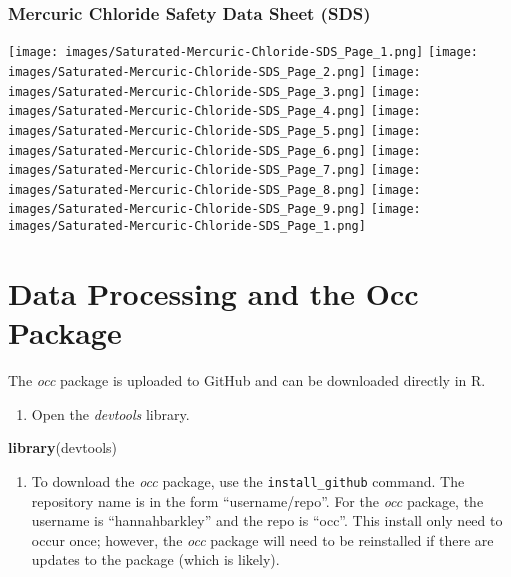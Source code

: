\documentclass[]{book}
\newenvironment{Shaded}{\begin{snugshade}}{\end{snugshade}}
\newcommand{\KeywordTok}[1]{\textcolor[rgb]{0.13,0.29,0.53}{\textbf{#1}}}
\newcommand{\NormalTok}[1]{#1}
\providecommand{\tightlist}{%
  \setlength{\itemsep}{0pt}\setlength{\parskip}{0pt}}
\begin{document}
\subsection{Mercuric Chloride Safety Data Sheet
(SDS)}\label{mercuric-chloride-safety-data-sheet-sds}

\texttt{[image: images/Saturated-Mercuric-Chloride-SDS\_Page\_1.png]}
\texttt{[image: images/Saturated-Mercuric-Chloride-SDS\_Page\_2.png]}
\texttt{[image: images/Saturated-Mercuric-Chloride-SDS\_Page\_3.png]}
\texttt{[image: images/Saturated-Mercuric-Chloride-SDS\_Page\_4.png]}
\texttt{[image: images/Saturated-Mercuric-Chloride-SDS\_Page\_5.png]}
\texttt{[image: images/Saturated-Mercuric-Chloride-SDS\_Page\_6.png]}
\texttt{[image: images/Saturated-Mercuric-Chloride-SDS\_Page\_7.png]}
\texttt{[image: images/Saturated-Mercuric-Chloride-SDS\_Page\_8.png]}
\texttt{[image: images/Saturated-Mercuric-Chloride-SDS\_Page\_9.png]}
\texttt{[image: images/Saturated-Mercuric-Chloride-SDS\_Page\_1.png]}

\hypertarget{data_processing}{\chapter{Data Processing and the Occ
Package}\label{data_processing}}

The \emph{occ} package is uploaded to GitHub and can be downloaded
directly in R.

\begin{enumerate}
\def\labelenumi{\arabic{enumi}.}
\tightlist
\item
  Open the \emph{devtools} library.
\end{enumerate}

\begin{Shaded}
\begin{Highlighting}[]
\KeywordTok{library}\NormalTok{(devtools)}
\end{Highlighting}
\end{Shaded}

\begin{enumerate}
\def\labelenumi{\arabic{enumi}.}
\setcounter{enumi}{1}
\tightlist
\item
  To download the \emph{occ} package, use the \texttt{install\_github}
  command. The repository name is in the form ``username/repo''. For the
  \emph{occ} package, the username is ``hannahbarkley'' and the repo is
  ``occ''. This install only need to occur once; however, the \emph{occ}
  package will need to be reinstalled if there are updates to the
  package (which is likely).
\end{enumerate}
\end{document}
